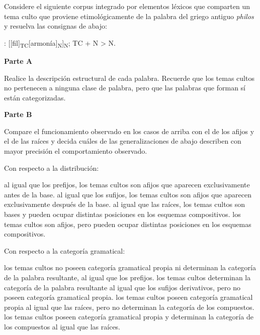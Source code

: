 \begin{ejercicio}\label{ej:04-filos}
Considere el siguiente corpus integrado por elementos léxicos que comparten un
tema culto que proviene etimológicamente de la palabra del griego antiguo
\textit{philos} y resuelva las consignas de abajo:


\begin{resuelto}
:
[[fil]\textsubscript{TC}[armonía]\textsubscript{N}]\textsubscript{N}; TC + N > N.
\end{resuelto}

\textbf{Parte A}

Realice la descripción estructural de cada palabra. Recuerde que los temas cultos
no pertenecen a ninguna clase de palabra, pero que las palabras que forman sí
están categorizadas.

\textbf{Parte B}

Compare el funcionamiento observado en los casos de arriba con el de los afijos
y el de las raíces y decida cuáles de las generalizaciones de abajo describen
con mayor precisión el comportamiento observado.

\begin{consignas}
  \item Con respecto a la distribución:
        \begin{exe}
          \ex al igual que los prefijos, los temas cultos son afijos que
              aparecen exclusivamente antes de la base.
          \ex al igual que los sufijos, los temas cultos son afijos que aparecen
              exclusivamente después de la base.
          \ex al igual que las raíces, los temas cultos son bases y pueden
              ocupar distintas posiciones en los esquemas compositivos.
          \ex los temas cultos son afijos, pero pueden ocupar distintas
              posiciones en los esquemas compositivos.
        \end{exe}
  \item Con respecto a la categoría gramatical:
        \begin{exe}
          \ex los temas cultos no poseen categoría gramatical propia ni
              determinan la categoría de la palabra resultante, al igual que los
              prefijos.
          \ex los temas cultos determinan la categoría de la palabra resultante
              al igual que los sufijos derivativos, pero no poseen categoría
              gramatical propia.
          \ex los temas cultos poseen categoría gramatical propia al igual que
              las raíces, pero no determinan la categoría de los compuestos.
          \ex los temas cultos poseen categoría gramatical propia y determinan
              la categoría de los compuestos al igual que las raíces.
        \end{exe}
\end{consignas}
\end{ejercicio}

